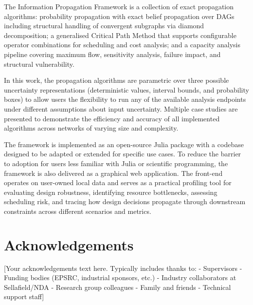 \documentclass[12pt,a4paper,twoside]{report}
\begin{document}
The Information Propagation Framework is a collection of exact propagation algorithms: probability propagation with exact belief propagation over DAGs including structural handling of convergent subgraphs via diamond decomposition; a generalised Critical Path Method that supports configurable operator combinations for scheduling and cost analysis; and a capacity analysis pipeline covering maximum flow, sensitivity analysis, failure impact, and structural vulnerability.

In this work, the propagation algorithms are parametric over three possible uncertainty representations (deterministic values, interval bounds, and probability boxes) to allow users the flexibility to run any of the available analysis endpoints under different assumptions about input uncertainty. Multiple case studies are presented to demonstrate the efficiency and accuracy of all implemented algorithms across networks of varying size and complexity.

The framework is implemented as an open-source Julia package with a codebase designed to be adapted or extended for specific use cases. To reduce the barrier to adoption for users less familiar with Julia or scientific programming, the framework is also delivered as a graphical web application. The front-end operates on user-owned local data and serves as a practical profiling tool for evaluating design robustness, identifying resource bottlenecks, assessing scheduling risk, and tracing how design decisions propagate through downstream constraints across different scenarios and metrics.



\chapter*{Acknowledgements}

[Your acknowledgements text here. Typically includes thanks to:
- Supervisors
- Funding bodies (EPSRC, industrial sponsors, etc.)
- Industry collaborators at Sellafield/NDA
- Research group colleagues
- Family and friends
- Technical support staff]


\end{document}
